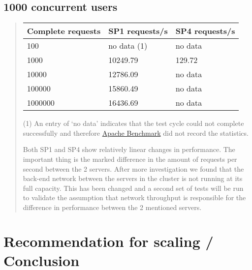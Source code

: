 \documentclass[letterpaper,10pt,english]{sphinxmanual}
\begin{document}
\section{1000 concurrent users}
\label{index:id15}\begin{quote}

\begin{tabulary}{\linewidth}{|L|L|L|}
\hline
\textbf{\relax 
Complete requests
} & \textbf{\relax 
SP1 requests/s
} & \textbf{\relax 
SP4 requests/s
}\\\hline

100
 & 
no data (1)
 & 
no data
\\\hline

1000
 & 
10249.79
 & 
129.72
\\\hline

10000
 & 
12786.09
 & 
no data
\\\hline

100000
 & 
15860.49
 & 
no data
\\\hline

1000000
 & 
16436.69
 & 
no data
\\\hline
\end{tabulary}


(1) An entry of `no data' indicates that the test cycle could not complete
successfully and therefore \href{https://httpd.apache.org/docs/2.2/programs/ab.html}{Apache Benchmark} did not record the statistics.

Both SP1 and SP4 show relatively linear changes in performance.  The important
thing is the marked difference in the amount of requests per second between
the 2 servers.  After more investigation we found that the back-end network
between the servers in the cluster is not running at its full capacity.  This
has been changed and a second set of tests will be run to validate the
assumption that network throughput is responsible for the difference in
performance between the 2 mentioned servers.
\end{quote}


\chapter{Recommendation for scaling / Conclusion}
\label{index:recommendation-for-scaling-conclusion}


\renewcommand{\indexname}{Index}
\printindex
\end{document}
